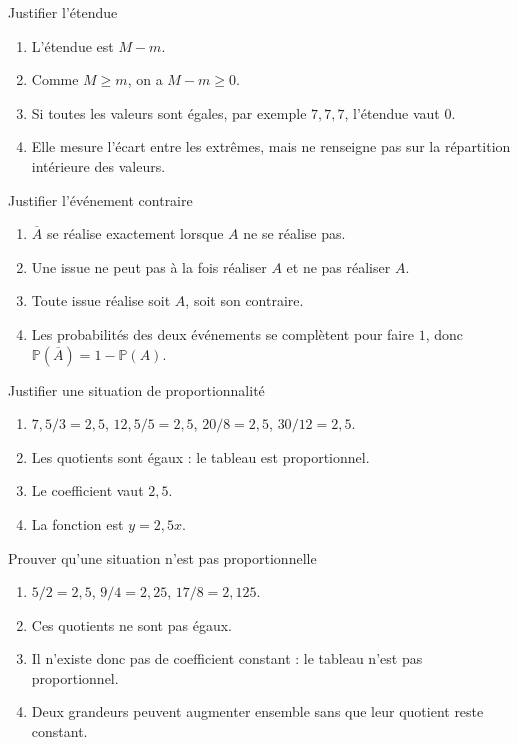 \documentclass[11pt,a4paper]{article}
\newcommand{\Prob}{\mathbb{P}}
\newcounter{corr}
\begin{document}
\begin{corrbox}{Justifier l'étendue}
\begin{enumerate}
\item L'étendue est $M-m$.
\item Comme $M\geq m$, on a $M-m\geq0$.
\item Si toutes les valeurs sont égales, par exemple $7,7,7$, l'étendue vaut $0$.
\item Elle mesure l'écart entre les extrêmes, mais ne renseigne pas sur la répartition intérieure des valeurs.
\end{enumerate}
\end{corrbox}

\begin{corrbox}{Justifier l'événement contraire}
\begin{enumerate}
\item $\overline A$ se réalise exactement lorsque $A$ ne se réalise pas.
\item Une issue ne peut pas à la fois réaliser $A$ et ne pas réaliser $A$.
\item Toute issue réalise soit $A$, soit son contraire.
\item Les probabilités des deux événements se complètent pour faire $1$, donc $\Prob(\overline A)=1-\Prob(A)$.
\end{enumerate}
\end{corrbox}

\begin{corrbox}{Justifier une situation de proportionnalité}
\begin{enumerate}
\item $7{,}5/3=2{,}5$, $12{,}5/5=2{,}5$, $20/8=2{,}5$, $30/12=2{,}5$.
\item Les quotients sont égaux : le tableau est proportionnel.
\item Le coefficient vaut $2{,}5$.
\item La fonction est $y=2{,}5x$.
\end{enumerate}
\end{corrbox}

\begin{corrbox}{Prouver qu'une situation n'est pas proportionnelle}
\begin{enumerate}
\item $5/2=2{,}5$, $9/4=2{,}25$, $17/8=2{,}125$.
\item Ces quotients ne sont pas égaux.
\item Il n'existe donc pas de coefficient constant : le tableau n'est pas proportionnel.
\item Deux grandeurs peuvent augmenter ensemble sans que leur quotient reste constant.
\end{enumerate}
\end{corrbox}
\end{document}
